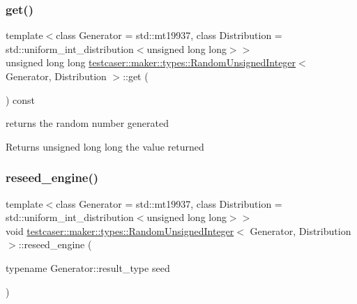 \subsubsection{\texorpdfstring{get()}{get()}}
{\footnotesize\ttfamily template$<$class Generator = std\+::mt19937, class Distribution = std\+::uniform\+\_\+int\+\_\+distribution$<$unsigned long long$>$$>$ \\
unsigned long long \mbox{\hyperlink{classtestcaser_1_1maker_1_1types_1_1RandomUnsignedInteger}{testcaser\+::maker\+::types\+::\+Random\+Unsigned\+Integer}}$<$ Generator, Distribution $>$\+::get (\begin{DoxyParamCaption}{ }\end{DoxyParamCaption}) const\hspace{0.3cm}{\ttfamily [inline]}}



returns the random number generated 

\begin{DoxyReturn}{Returns}
unsigned long long the value returned 
\end{DoxyReturn}
\mbox{\label{classtestcaser_1_1maker_1_1types_1_1RandomUnsignedInteger_ac0ec747e5fe2701bd3533866e97ffcf7}} 
\subsubsection{\texorpdfstring{reseed\_engine()}{reseed\_engine()}}
{\footnotesize\ttfamily template$<$class Generator = std\+::mt19937, class Distribution = std\+::uniform\+\_\+int\+\_\+distribution$<$unsigned long long$>$$>$ \\
void \mbox{\hyperlink{classtestcaser_1_1maker_1_1types_1_1RandomUnsignedInteger}{testcaser\+::maker\+::types\+::\+Random\+Unsigned\+Integer}}$<$ Generator, Distribution $>$\+::reseed\+\_\+engine (\begin{DoxyParamCaption}\item[{typename Generator\+::result\+\_\+type}]{seed }\end{DoxyParamCaption})\hspace{0.3cm}{\ttfamily [inline]}}



